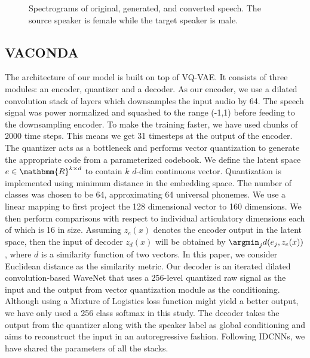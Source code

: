 




\begin{figure}[t]
  \centering 
  \caption{Spectrograms of original, generated, and converted speech. The source speaker is female while the target speaker is male.\label{fig:waveform}}
\end{figure}


\subsection{VACONDA}

The architecture of our model is built on top of VQ-VAE. It consists of three modules: an encoder, quantizer and a decoder. As our encoder, we use a dilated convolution stack of layers which downsamples the input audio by 64. The speech signal was power normalized and squashed to the range (-1,1) before feeding to the downsampling encoder. To make the training faster, we have used chunks of 2000 time steps. This means we get 31 timesteps at the output of the encoder. The quantizer acts as a bottleneck and performs vector quantization to generate the appropriate code from a parameterized codebook. We define the latent space $e \in \mathbmm{R}^{k\times d}$ to contain $k$ $d$-dim continuous vector. Quantization is implemented using minimum distance in the embedding space. The number of classes was chosen to be 64, approximating 64 universal phonemes. We use a linear mapping to first project the 128 dimensional vector to 160 dimensions. We then perform comparisons with respect to individual articulatory dimensions each of which is 16 in size.  Assuming $z_e(x)$ denotes the encoder output in the latent space, then the input of decoder $z_d(x)$ will be obtained by $\argmin_{j}d(e_j, z_e(x))$, where $d$ is a similarity function of two vectors. In this paper, we consider Euclidean distance as the similarity metric.  Our decoder is an iterated dilated convolution-based WaveNet that uses a 256-level quantized raw signal as the input and the output from vector quantization module as the conditioning. Although using a Mixture of Logistics loss function might yield a better output, we have only used a 256 class softmax in this study. The decoder takes the output from the quantizer along with the speaker label as global conditioning and aims to reconstruct the input in an autoregressive fashion. Following IDCNNs, we have shared the parameters of all the stacks.



